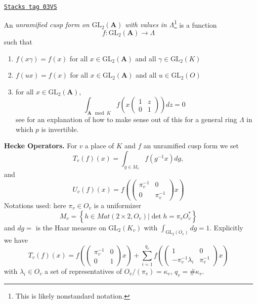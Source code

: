 \begin{definition}[Unramified]
\label{trace-definition-unramified}
\href{https://stacks.math.columbia.edu/tag/03VS}{\texttt{Stacks tag 03VS}}

An {\it unramified cusp form on $\text{GL}_2(\mathbf{A})$ with values in
$\Lambda$}\footnote{This is likely nonstandard notation.}
is a function
$$
f : \text{GL}_2(\mathbf{A}) \to \Lambda
$$
such that
\begin{enumerate}
\item $f(x\gamma) = f(x)$ for all $x\in \text{GL}_2(\mathbf{A})$ and all
$\gamma\in \text{GL}_2(K)$
\item $f(ux) = f(x)$ for all $x\in \text{GL}_2(\mathbf{A})$ and all
$u\in \text{GL}_2(O)$
\item for all $x\in \text{GL}_2(\mathbf{A})$,
$$
\int_{\mathbf{A} \mod K} f
\left(x
\left(
\begin{matrix}
1 & z \\
0 & 1
\end{matrix}
\right)
\right) dz = 0
$$
see \cite[Section 4.1]{dJ-conjecture}
for an explanation of how to make sense out
of this for a general ring $\Lambda$ in which $p$ is invertible.
\end{enumerate}
\end{definition}

{\bf Hecke Operators.}
For $v$ a place of $K$ and $f$ an unramified cusp form we set
$$
T_v(f)(x) =
\int_{g\in M_v}f(g^{-1}x)dg,
$$
and
$$
U_v(f)(x) =
f\left(
\left(
\begin{matrix}
\pi_v^{-1} & 0 \\
0 & \pi_v^{-1}
\end{matrix}
\right)x\right)
$$
Notations used: here $\pi_v \in O_v$ is a uniformizer
$$
M_v =
\left\{
h\in Mat(2\times 2, O_v) | \det h = \pi_vO_v^*\right\}
$$
and $dg = $ is the Haar measure on $\text{GL}_2(K_v)$ with
$\int_{\text{GL}_2(O_v)} dg = 1$. Explicitly we have
$$
T_v(f)(x) =
f\left(
\left(
\begin{matrix}
\pi_v^{-1}& 0 \\
0 & 1
\end{matrix}
\right)
x\right) +
\sum_{i = 1}^{q_v}
f\left(\left(
\begin{matrix}
1 & 0 \\
-\pi_v^{-1}\lambda_i
& \pi_v^{-1}
\end{matrix}
\right) x\right)
$$
with $\lambda_i\in O_v$ a set of representatives of
$O_v/(\pi_v)=\kappa_v$, $q_v = \#\kappa_v$.

